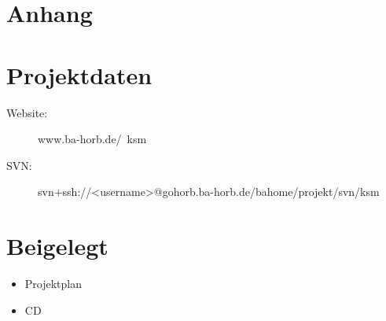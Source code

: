 \section{Anhang}

\lstlistoflistings
\listoffigures
\newpage
\section*{Projektdaten}
\begin{description}
\item[Website:] www.ba-horb.de/~ksm
\item[SVN:] svn+ssh://<username>@gohorb.ba-horb.de/bahome/projekt/svn/ksm
\end{description}

\section*{Beigelegt}
\begin{itemize}
\item Projektplan
\item CD
\end{itemize}
